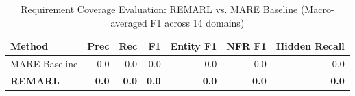 \begin{table}[t]
\centering
\caption{Requirement Coverage Evaluation: REMARL vs. MARE Baseline (Macro-averaged F1 across 14 domains)}
\label{tab:eval_results}
\begin{tabular}{lrrrrrr}
\toprule
Method & Prec & Rec & F1 & Entity F1 & NFR F1 & Hidden Recall \\
\midrule
MARE Baseline & 0.0 & 0.0 & 0.0 & 0.0 & 0.0 & 0.0 \\
\textbf{REMARL} & \textbf{0.0} & \textbf{0.0} & \textbf{0.0} & \textbf{0.0} & \textbf{0.0} & \textbf{0.0} \\
\bottomrule
\end{tabular}
\end{table}